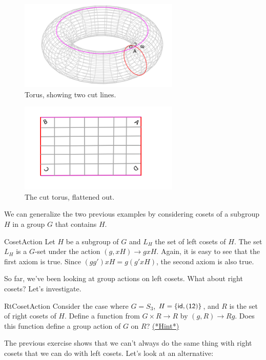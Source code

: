 \begin{figure}[ht]
\begin{center}
\includegraphics[width=3in]{images/Torus1.png}
\caption{Torus, showing two cut lines.}\label{fig:Torus1}
\end{center}
\end{figure}

\begin{figure}[ht]
\begin{center}
\includegraphics[width=3in]{images/Torus2.png}
\caption{The cut torus, flattened out.}\label{fig:Torus2}
\end{center}
\end{figure}

We can generalize the two previous examples by considering cosets of a subgroup $H$ in a group $G$ that contains $H$.

\begin{example}{CosetAction}
Let $H$ be a subgroup of $G$ and $L_H$ the set of left cosets of $H$. The set $L_H$ is a $G$-set under the action 
$(g,xH)\rightarrow gxH$.
Again, it is easy to see that the first axiom is true. Since $(gg')xH = g(g'xH)$, the second axiom is also true.
\end{example}
So far, we've been looking at group actions on left cosets.  What about right cosets?  Let's investigate.

\begin {exercise}{RtCosetAction}
Consider the case where $G=S_3$, $H=\{\sf{id},(12)\}$, and $R$ is the set of right cosets of $H$.  Define a function from $G\times R\rightarrow R$ by $(g,R)\rightarrow Rg$. Does this function define a group action of $G$ on $R$? 
\hyperref[sec:actions:hints]{(*Hint*)}
\end {exercise}
The previous exercise shows that we can't always do the same thing with right cosets that we can do with left cosets.  Let's look at an alternative:  

